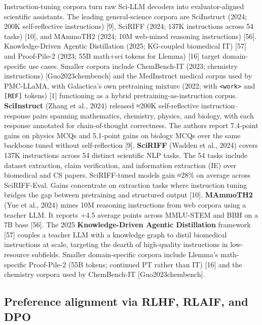 Instruction-tuning corpora turn raw Sci-LLM decoders into evaluator-aligned scientific assistants. The leading general-science corpora are SciInstruct (2024; 200K self-reflective instructions) {[}9{]}, SciRIFF (2024; 137K instructions across 54 tasks) {[}10{]}, and MAmmoTH2 (2024; 10M web-mined reasoning instructions) {[}56{]}. Knowledge-Driven Agentic Distillation (2025; KG-coupled biomedical IT) {[}57{]} and Proof-Pile-2 (2023; 55B math+sci tokens for Llemma) {[}16{]} target domain-specific use cases. Smaller corpora include ChemBench-IT (2023; chemistry instructions) {[}Guo2023chembench{]} and the MedInstruct medical corpus used by PMC-LLaMA, with Galactica's own pretraining mixture (2022; with \texttt{\textless{}work\textgreater{}} and \texttt{{[}REF{]}} tokens) {[}1{]} functioning as a hybrid pretraining-as-instruction corpus. \textbf{SciInstruct} (Zhang et al., 2024) released ≈200K self-reflective instruction--response pairs spanning mathematics, chemistry, physics, and biology, with each response annotated for chain-of-thought correctness. The authors report 7.4-point gains on physics MCQs and 5.1-point gains on biology MCQs over the same backbone tuned without self-reflection {[}9{]}. \textbf{SciRIFF} (Wadden et al., 2024) covers 137K instructions across 54 distinct scientific NLP tasks. The 54 tasks include dataset extraction, claim verification, and information extraction (IE) over biomedical and CS papers. SciRIFF-tuned models gain ≈28\% on average across SciRIFF-Eval. Gains concentrate on extraction tasks where instruction tuning bridges the gap between pretraining and structured output {[}10{]}. \textbf{MAmmoTH2} (Yue et al., 2024) mines 10M reasoning instructions from web corpora using a teacher LLM. It reports +4.5 average points across MMLU-STEM and BBH on a 7B base {[}56{]}. The 2025 \textbf{Knowledge-Driven Agentic Distillation} framework {[}57{]} couples a teacher LLM with a knowledge graph to distil biomedical instructions at scale, targeting the dearth of high-quality instructions in low-resource subfields. Smaller domain-specific corpora include Llemma's math-specific Proof-Pile-2 (55B tokens; continued PT rather than IT) {[}16{]} and the chemistry corpora used by ChemBench-IT {[}Guo2023chembench{]}.

\subsection{Preference alignment via RLHF, RLAIF, and DPO}\label{preference-alignment-via-rlhf-rlaif-and-dpo}

